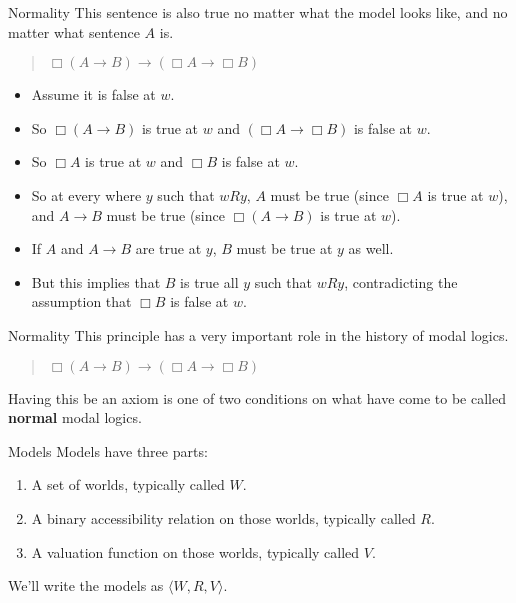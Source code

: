 \documentclass[
  14pt,
  letterpaper,
  ignorenonframetext,
  aspectratio=169,
]{beamer}
\providecommand{\tightlist}{%
  \setlength{\itemsep}{0pt}\setlength{\parskip}{0pt}}\usepackage{longtable,booktabs,array}
\begin{document}
\begin{frame}{Normality}
\protect\hypertarget{normality}{}
This sentence is also true no matter what the model looks like, and no
matter what sentence \(A\) is.

\begin{quote}
\(\Box (A \rightarrow B) \rightarrow (\Box A \rightarrow \Box B)\)
\end{quote}

\begin{itemize}[<+->]
\tightlist
\item
  Assume it is false at \(w\).
\item
  So \(\Box (A \rightarrow B)\) is true at \(w\) and
  \((\Box A \rightarrow \Box B)\) is false at \(w\).
\item
  So \(\Box A\) is true at \(w\) and \(\Box B\) is false at \(w\).
\item
  So at every where \(y\) such that \(wRy\), \(A\) must be true (since
  \(\Box A\) is true at \(w\)), and \(A \rightarrow B\) must be true
  (since \(\Box(A \rightarrow B)\) is true at \(w\)).
\item
  If \(A\) and \(A \rightarrow B\) are true at \(y\), \(B\) must be true
  at \(y\) as well.
\item
  But this implies that \(B\) is true all \(y\) such that \(wRy\),
  contradicting the assumption that \(\Box B\) is false at \(w\).
\end{itemize}
\end{frame}

\begin{frame}{Normality}
\protect\hypertarget{normality-1}{}
This principle has a very important role in the history of modal logics.

\begin{quote}
\(\Box (A \rightarrow B) \rightarrow (\Box A \rightarrow \Box B)\)
\end{quote}

Having this be an axiom is one of two conditions on what have come to be
called \textbf{normal} modal logics.
\end{frame}

\begin{frame}{Models}
\protect\hypertarget{models}{}
Models have three parts:

\begin{enumerate}[<+->]
\tightlist
\item
  A set of worlds, typically called \(W\).
\item
  A binary accessibility relation on those worlds, typically called
  \(R\).
\item
  A valuation function on those worlds, typically called \(V\).
\end{enumerate}

We'll write the models as \(\langle W, R, V\rangle\).
\end{frame}
\end{document}
